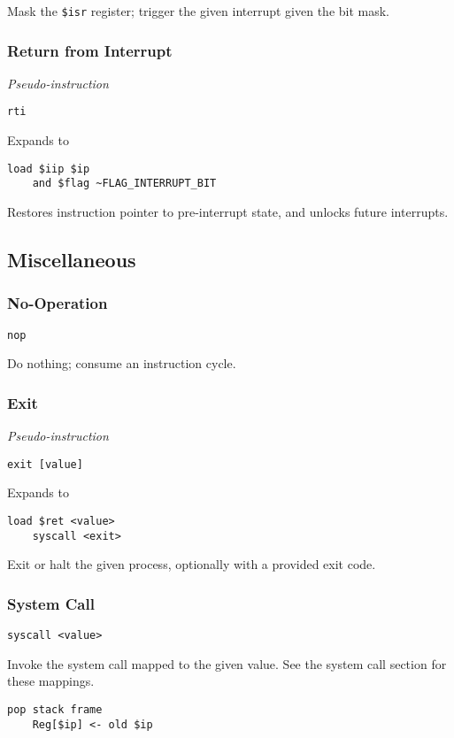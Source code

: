 Mask the \texttt{\$isr} register; trigger the given interrupt given the bit mask.

\subsubsection{Return from Interrupt}

\textit{Pseudo-instruction}

\begin{lstlisting}[style=assembly]
    rti
\end{lstlisting}

Expands to

\begin{lstlisting}[style=assembly]
    load $iip $ip
    and $flag ~FLAG_INTERRUPT_BIT
\end{lstlisting}

Restores instruction pointer to pre-interrupt state, and unlocks future interrupts.

\subsection{Miscellaneous}

\subsubsection{No-Operation}

\begin{lstlisting}[style=assembly]
    nop
\end{lstlisting}

Do nothing; consume an instruction cycle.

\subsubsection{Exit}

\textit{Pseudo-instruction}

\begin{lstlisting}[style=assembly]
    exit [value]
\end{lstlisting}

Expands to

\begin{lstlisting}[style=assembly]
    load $ret <value>
    syscall <exit>
\end{lstlisting}

Exit or halt the given process, optionally with a provided exit code.

\subsubsection{System Call}

\begin{lstlisting}[style=assembly]
    syscall <value>
\end{lstlisting}

Invoke the system call mapped to the given value.
See the system call section for these mappings.

\begin{lstlisting}[style=rtn]
    pop stack frame
    Reg[$ip] <- old $ip
\end{lstlisting}
